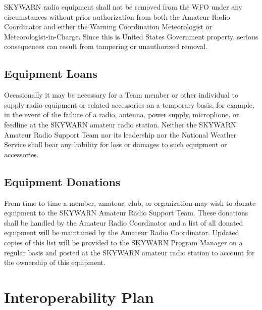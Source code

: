 \documentclass[pdflatex,letterpaper,twoside,12pt]{book}
\begin{document}
SKYWARN radio equipment shall not be removed from the WFO under any circumstances without prior authorization from both the Amateur Radio Coordinator and either the Warning Coordination Meteorologist or Meteorologist-in-Charge.  Since this is United States Government property, serious consequences can result from tampering or unauthorized removal.


\section{Equipment Loans}

Occasionally it may be necessary for a Team member or other individual to supply radio equipment or related accessories on a temporary basis, for example, in the event of the failure of a radio, antenna, power supply, microphone, or feedline at the SKYWARN amateur radio station.  Neither the SKYWARN Amateur Radio Support Team nor its leadership nor the National Weather Service shall bear any liability for loss or damages to such equipment or accessories. 


\section{Equipment Donations}

From time to time a member, amateur, club, or organization may wish to donate equipment to the SKYWARN Amateur Radio Support Team.  These donations shall be handled by the Amateur Radio Coordinator and a list of all donated equipment will be maintained by the Amateur Radio Coordinator. Updated copies of this list will be provided to the SKYWARN Program Manager on a regular basis and posted at the SKYWARN amateur radio station to account for the ownership of this equipment.


\chapter{Interoperability Plan}
\end{document}
